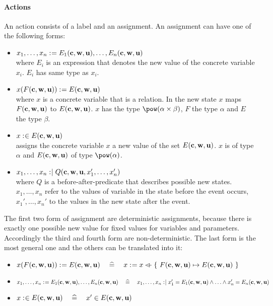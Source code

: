 \paragraph{Actions}
\label{actions}
An action consists of a label and an assignment.
An assignment can have one of the following forms:
\begin{itemize}
\item $x_1,\ldots,x_n \mathrel{:\mkern1mu=} E_1(\textbf{c},\textbf{w},\textbf{u}),\ldots,E_n(\textbf{c},\textbf{w},\textbf{u})$ \\
  where $E_i$ is an expression that denotes the new value of the concrete variable $x_i$.
  $E_i$ has same type as $x_i$.
\item $x(F(\textbf{c},\textbf{w},\textbf{u})) \mathrel{:\mkern1mu=} E(\textbf{c},\textbf{w},\textbf{u})$ \\
  where $x$ is a concrete variable that is a relation.
  In the new state $x$ maps $F(\textbf{c},\textbf{w},\textbf{u})$ to $E(\textbf{c},\textbf{w},\textbf{u})$.
  $x$ has the type $\pow(\alpha\cprod\beta)$, $F$ the type $\alpha$ and $E$ the
  type $\beta$.
\item $x \mathrel{:\mkern1mu\in} E(\textbf{c},\textbf{w},\textbf{u})$ \\
  assigns the concrete variable $x$ a new value of the set $E(\textbf{c},\textbf{w},\textbf{u})$.
  $x$ is of type
  $\alpha$ and $E(\textbf{c},\textbf{w},\textbf{u})$ of type $\pow(\alpha)$.
\item $x_1,\ldots,x_n \mathrel{:\mkern1mu\mid} Q(\textbf{c},\textbf{w},\textbf{u},x_1',\ldots,x_n')$ \\
  where $Q$ is a before-after-predicate that describes possible new states.
  $x_1,\ldots,x_n$ refer to the values of variable in the state before the event occurs,
  $x_1',\ldots,x_n'$ to the values in the new state after the event.
\end{itemize}
The first two form of assignment are deterministic assignments, because 
  there is exactly one possible new value for fixed values for variables and parameters.
Accordingly the third and fourth form are non-deterministic.
The last form is the most general one and the others can be translated into it:
\begin{itemize}
\item $x(F(\textbf{c},\textbf{w},\textbf{u})) \mathrel{:\mkern1mu=} E(\textbf{c},\textbf{w},\textbf{u})
  \quad\mathrel{\widehat=}\quad 
  x \mathrel{:\mkern1mu=} x \mathbin{\lhd\mkern-9mu-} \{~F(\textbf{c},\textbf{w},\textbf{u}) \mapsto E(\textbf{c},\textbf{w},\textbf{u})~\}$
\item $x_1,\ldots,x_n \mathrel{:\mkern1mu=} E_1(\textbf{c},\textbf{w},\textbf{u}),\ldots,E_n(\textbf{c},\textbf{w},\textbf{u})
  \quad\mathrel{\widehat=}\quad
  x_1,\ldots,x_n \mathrel{:\mkern1mu\mid} x_1' = E_1(\textbf{c},\textbf{w},\textbf{u}) \land \ldots \land x_n' = E_n(\textbf{c},\textbf{w},\textbf{u})$
\item $x \mathrel{:\mkern1mu\in} E(\textbf{c},\textbf{w},\textbf{u}) 
  \quad\mathrel{\widehat=}\quad
  x' \in E(\textbf{c},\textbf{w},\textbf{u})$
\end{itemize}
